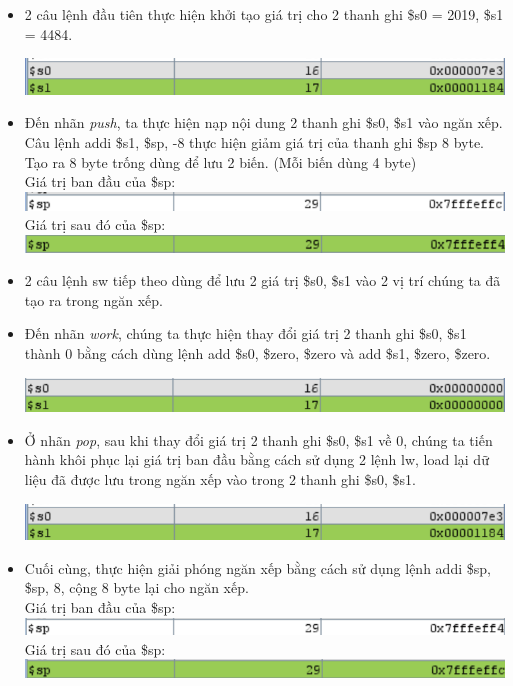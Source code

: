 \documentclass[12pt,a4paper,oneside]{article}
\begin{document}
	\begin{itemize}
	\item 2 câu lệnh đầu tiên thực hiện khởi tạo giá trị cho 2 thanh ghi \$s0 = 2019, \$s1 = 4484.
	\begin{center}
	\includegraphics[scale=1]{image/3.1}
	\end{center}
	\item Đến nhãn \textit{push}, ta thực hiện nạp nội dung 2 thanh ghi \$s0, \$s1 vào ngăn xếp. Câu lệnh \colorbox{code}{addi \$s1, \$sp, -8} thực hiện giảm giá trị của thanh ghi \$sp 8 byte. Tạo ra 8 byte trống dùng để lưu 2 biến. (Mỗi biến dùng 4 byte)\\
	Giá trị ban đầu của \$sp:\quad \includegraphics[scale=1]{image/3.2}\\
	Giá trị sau đó của \$sp: \quad \includegraphics[scale=1]{image/3.3}
	\item 2 câu lệnh \colorbox{code}{sw} tiếp theo dùng để lưu 2 giá trị \$s0, \$s1 vào 2 vị trí chúng ta đã tạo ra trong ngăn xếp.
	\item Đến nhãn \textit{work}, chúng ta thực hiện thay đổi giá trị 2 thanh ghi \$s0, \$s1 thành 0 bằng cách dùng lệnh \colorbox{code}{add \$s0, \$zero, \$zero} và \colorbox{code}{add \$s1, \$zero, \$zero}.
	\begin{center}
	\includegraphics[scale=1]{image/3.4}
	\end{center}
	\item Ở nhãn \textit{pop}, sau khi thay đổi giá trị 2 thanh ghi \$s0, \$s1 về 0, chúng ta tiến hành khôi phục lại giá trị ban đầu bằng cách sử dụng 2 lệnh \colorbox{code}{lw}, load lại dữ liệu đã được lưu trong ngăn xếp vào trong 2 thanh ghi \$s0, \$s1.
	\begin{center}
	\includegraphics[scale=1]{image/3.1}
	\end{center}
	\item Cuối cùng, thực hiện giải phóng ngăn xếp bằng cách sử dụng lệnh \colorbox{code}{addi \$sp, \$sp, 8}, cộng 8 byte lại cho ngăn xếp.\\
	Giá trị ban đầu của \$sp:\quad \includegraphics[scale=1]{image/3.5}\\
	Giá trị sau đó của \$sp: \quad \includegraphics[scale=1]{image/3.6}
	\end{itemize}
\end{document}
